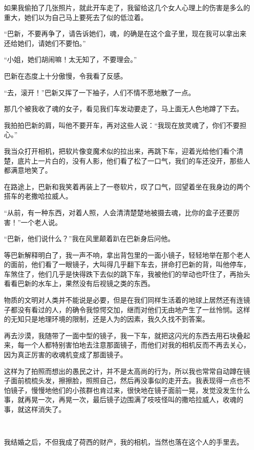 \par 如果我偷拍了几张照片，就此开车走了，我留给这几个女人心理上的伤害是多么的重大，她们以为自己马上要死去了似的低泣着。
\par “巴新，不要再争了，请告诉她们，魂，的确是在这个盒子里，现在我可以拿出来还给她们，请她们不要怕。”
\par “小姐，她们胡闹嘛！太无知了，不要理会。”
\par 巴新在态度上十分傲慢，令我看了反感。
\par “去，滚开！”巴新又挥了一下袖子，人们不情不愿地散了一点。
\par 那几个被我收了魂的女子，看见我们车发动要走了，马上面无人色地蹲了下去。
\par 我拍拍巴新的肩，叫他不要开车，再对这些人说：“我现在放灵魂了，你们不要担心。”
\par 我当众打开相机，把软片像变魔术似的拉出来，再跳下车，迎着光给他们看个清楚，底片上一片白的，没有人影，他们看了松了一口气，我们的车还没开，那些人都满意地笑了。
\par 在路途上，巴新和我笑着再装上了一卷软片，叹了口气，回望着坐在我身边的两个搭车的老撒哈拉威人。
\par “从前，有一种东西，对着人照，人会清清楚楚地被摄去魂，比你的盒子还要厉害！”一个老人说。
\par “巴新，他们说什么？”我在风里颠着趴在巴新身后问他。
\par 等巴新解释明白了，我一声不响，拿出背包里的一面小镜子，轻轻地举在那个老人的面前，他们看了一眼镜子，大叫得几乎翻下车去，拼命打巴新的背，叫他停车，车煞住了，他们几乎是快得跌下去似的跳下车，我被他们的举动也吓住了，再抬头看看巴新的水车上，果然没有后视镜之类的东西。
\par 物质的文明对人类并不能说是必要，但是在我们同样生活着的地球上居然还有连镜子都没有看过的人，的确令我惊愕交加，继而对他们无由地产生了一丝怜悯。这样的无知只是地理环境的限制，还是人为的因素，我久久找不到答案。
\par 再去沙漠，我随带了一面中型的镜子，我一下车，就把这闪光的东西去用石块叠起来，每一个人都特别害怕地去注意那面镜子，而他们对我的相机反而不再去关心，因为真正厉害的收魂机变成了那面镜子。
\par 这样为了拍照而想出的愚民之计，并不是太高尚的行为，所以我也常常自动蹲在镜子面前梳梳头发，擦擦脸，照照自己，然后再没事似的走开去。我表现得一点也不怕镜子，慢慢地他们的小孩群也肯过来，很快地在镜子面前一晃，发觉没发生什么事，就再晃一次，再晃一次，最后镜子边围满了吱吱怪叫的撒哈拉威人，收魂的事，就这样消失了。
\par  
\par 我结婚之后，不但我成了荷西的财产，我的相机，当然也落在这个人的手里去。
